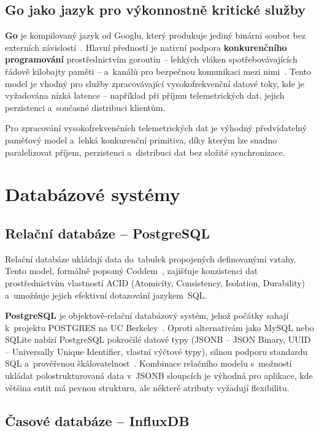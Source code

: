 \subsection{Go jako jazyk pro výkonnostně kritické služby}

\textbf{Go} je kompilovaný jazyk od Googlu, který produkuje jediný binární soubor bez externích závislostí~\cite{donovan2015go}. Hlavní předností je nativní podpora \textbf{konkurenčního programování} prostřednictvím goroutin -- lehkých vláken spotřebovávajících řádově kilobajty paměti -- a~kanálů pro bezpečnou komunikaci mezi nimi~\cite{tu2019go, gospec2024}. Tento model je vhodný pro služby zpracovávající vysokofrekvenční datové toky, kde je vyžadována nízká latence -- například při příjmu telemetrických dat, jejich perzistenci a~současné distribuci klientům.

Pro zpracování vysokofrekvenčních telemetrických dat je výhodný předvídatelný paměťový model a~lehká konkurenční primitiva, díky kterým lze snadno paralelizovat příjem, perzistenci a~distribuci dat bez složité synchronizace.

\section{Databázové systémy}

\subsection{Relační databáze -- PostgreSQL}

Relační databáze ukládají data do~tabulek propojených definovanými vztahy. Tento model, formálně popsaný Coddem~\cite{codd1970relational}, zajišťuje konzistenci dat prostřednictvím vlastností ACID (Atomicity, Consistency, Isolation, Durability) a~umožňuje jejich efektivní dotazování jazykem~SQL.

\textbf{PostgreSQL} je objektově-relační databázový systém, jehož počátky sahají k~projektu POSTGRES na UC Berkeley~\cite{stonebraker1986postgres}. Oproti alternativám jako MySQL nebo SQLite nabízí PostgreSQL pokročilé datové typy (JSONB -- JSON Binary, UUID -- Universally Unique Identifier, vlastní výčtové typy), silnou podporu standardu SQL a~prověřenou škálovatelnost~\cite{postgresql2024docs}. Kombinace relačního modelu s~možností ukládat polostrukturovaná data v~JSONB sloupcích je výhodná pro aplikace, kde většina entit má pevnou strukturu, ale některé atributy vyžadují flexibilitu.

\subsection{Časové databáze -- InfluxDB}


